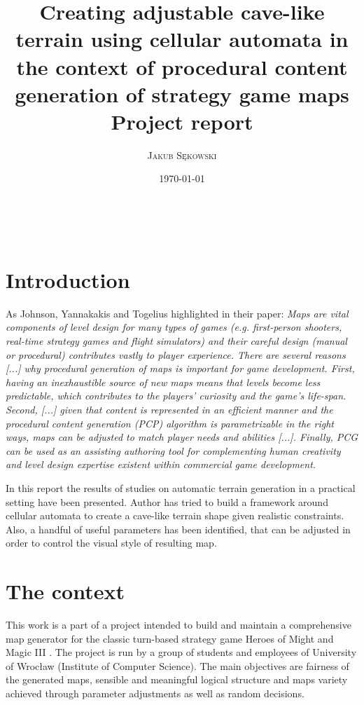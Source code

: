 \documentclass[a4paper, 11pt]{article} %
\title{\Large \textbf{Creating adjustable cave-like terrain using cellular automata in the context of procedural content generation of strategy game maps} \\ %
\large{Project report}} %
\author{\textsc{Jakub Sękowski} %
\\{\textit{}}} %
\date{\today} %
\makeatletter
\renewcommand{\maketitle}{ %
\begin{flushright} %
{\LARGE\@title} %

\vspace{70pt} %

{\large\@author} %
\\\@date %

\vspace{40pt} %
\end{flushright}
}
\makeatother
\begin{document}
\maketitle %

\vspace{60pt}


\section*{Introduction}

As Johnson, Yannakakis and Togelius highlighted in their paper: \textit{Maps are vital components of level design for many types of games (e.g. first-person shooters, real-time strategy games and flight simulators) and their careful design (manual or procedural) contributes vastly to player experience. There are several reasons [...] why procedural generation of maps is important for game development. First, having an inexhaustible source of new maps means that levels become less predictable, which contributes to the players’ curiosity and the game’s life-span. Second, [...] given that content is represented in an efficient manner and the procedural content generation (PCP) algorithm is parametrizable in the right ways, maps can be adjusted to match player needs and abilities [...]. Finally, PCG can be used as an assisting authoring tool for complementing human creativity and level design expertise existent within commercial game development.} \cite{paper}

In this report the results of studies on automatic terrain generation in a practical setting have been presented. Author has tried to build a framework around cellular automata to create a cave-like terrain shape given realistic constraints. Also, a handful of useful parameters has been identified, that can be adjusted in order to control the visual style of resulting map.


\section*{The context}

This work is a part of a project intended to build and maintain a comprehensive map generator for the classic turn-based strategy game Heroes of Might and Magic III \cite{h3}. The project is run by a group of students and employees of University of Wrocław (Institute of Computer Science). The main objectives are fairness of the generated maps, sensible and meaningful logical structure and maps variety achieved through parameter adjustments as well as random decisions.
\end{document}

